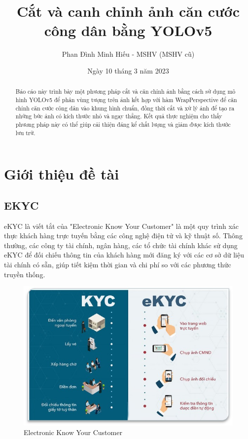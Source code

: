 \documentclass [10pt, fancyhdr, twoside] {article}
\begin{document}
\title{Cắt và canh chỉnh ảnh căn cước công dân bằng YOLOv5}
\author {Phan Đình Minh Hiếu - MSHV (MSHV cũ)}
\date{{Ngày 10 tháng 3 năm 2023}}
\maketitle

\begin{abstract}
    Báo cáo này trình bày một phương pháp cắt và căn chỉnh ảnh bằng cách sử dụng mô hình YOLOv5 để phân vùng tượng trên ảnh kết hợp với hàm WrapPerspective để căn chỉnh căn cước công dân vào khung hình chuẩn, đồng thời cắt và xử lý ảnh để tạo ra những bức ảnh có kích thước nhỏ và ngay thẳng. Kết quả thực nghiệm cho thấy phương pháp này có thể giúp cải thiện đáng kể chất lượng và giảm được kích thước lưu trữ.
\end{abstract}

\section{Giới thiệu đề tài}
\subsection{EKYC}
eKYC là viết tắt của "Electronic Know Your Customer" là một quy trình xác thực khách hàng trực tuyến bằng các công nghệ điện tử và kỹ thuật số. Thông thường, các công ty tài chính, ngân hàng, các tổ chức tài chính khác sử dụng eKYC để đối chiếu thông tin của khách hàng mới đăng ký với các cơ sở dữ liệu tài chính có sẵn, giúp tiết kiệm thời gian và chi phí so với các phương thức truyền thống.

\begin{figure}[h]
    \caption{Electronic Know Your Customer}
    \centering
    \includegraphics[width=15cm]{Picture1.jpg}
\end{figure}
\end{document}
